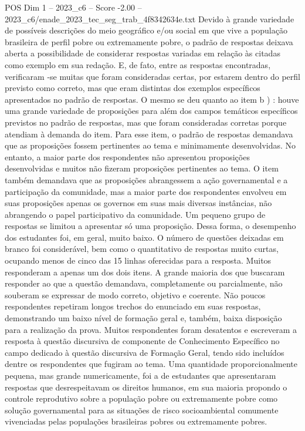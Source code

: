 \begin{textsample}{POS Dim 1 – 2023\_c6 – Score -2.00 – 2023\_c6/enade\_2023\_tec\_seg\_trab\_4f8342634e.txt}
Devido à grande variedade de possíveis descrições do meio geográfico e/ou social em que vive a população brasileira de perfil pobre ou extremamente pobre, o padrão de respostas deixava aberta a possibilidade de considerar respostas variadas em relação às citadas como exemplo em sua redação.
E, de fato, entre as respostas encontradas, verificaram -se muitas que foram consideradas certas, por estarem dentro do perfil previsto como correto, mas que eram distintas dos exemplos específicos apresentados no padrão de respostas.
O mesmo se deu quanto ao item b ) : houve uma grande variedade de proposições para além dos campos temáticos específicos previstos no padrão de respostas, mas que foram consideradas corretas porque atendiam à demanda do item.
Para esse item, o padrão de respostas demandava que as proposições fossem pertinentes ao tema e minimamente desenvolvidas.
No entanto, a maior parte dos respondentes não apresentou proposições desenvolvidas e muitos não fizeram proposições pertinentes ao tema.
O item também demandava que as proposições abrangessem a ação governamental e a participação da comunidade, mas a maior parte dos respondentes envolveu em suas proposições apenas os governos em suas mais diversas instâncias, não abrangendo o papel participativo da comunidade.
Um pequeno grupo de respostas se limitou a apresentar só uma proposição.
Dessa forma, o desempenho dos estudantes foi, em geral, muito baixo.
O número de questões deixadas em branco foi considerável, bem como o quantitativo de respostas muito curtas, ocupando menos de cinco das 15 linhas oferecidas para a resposta.
Muitos responderam a apenas um dos dois itens.
A grande maioria dos que buscaram responder ao que a questão demandava, completamente ou parcialmente, não souberam se expressar de modo correto, objetivo e coerente.
Não poucos respondentes repetiram longos trechos do enunciado em suas respostas, demonstrando um baixo nível de formação geral e, também, baixa disposição para a realização da prova.
Muitos respondentes foram desatentos e escreveram a resposta à questão discursiva de componente de Conhecimento Específico no campo dedicado à questão discursiva de Formação Geral, tendo sido incluídos dentre os respondentes que fugiram ao tema.
Uma quantidade proporcionalmente pequena, mas grande numericamente, foi a de estudantes que apresentaram respostas que desrespeitavam os direitos humanos, em sua maioria propondo o controle reprodutivo sobre a população pobre ou extremamente pobre como solução governamental para as situações de risco socioambiental comumente vivenciadas pelas populações brasileiras pobres ou extremamente pobres.

\end{textsample}
